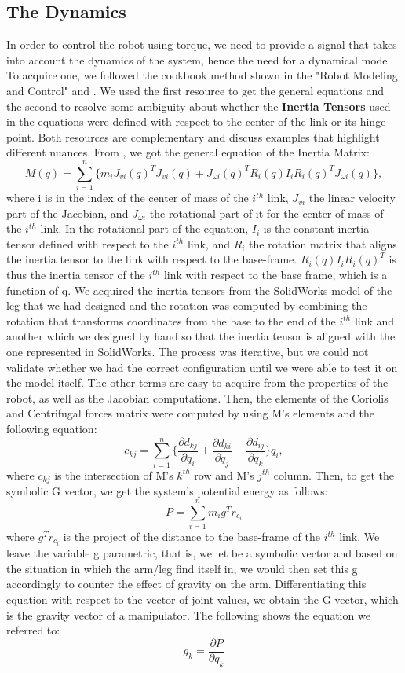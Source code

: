 \subsection{The Dynamics}
In order to control the robot using torque, we need to provide a signal that takes into account the dynamics of the system, hence the need for a dynamical model. To acquire one, we followed the cookbook method shown in the "Robot Modeling and Control" \cite{spong2006robot} and \cite{murray2017mathematical}. We used the first resource to get the general equations and the second to resolve some ambiguity about whether the \textbf{Inertia Tensors} used in the equations were defined with respect to the center of the link or its hinge point. Both resources are complementary and discuss examples that highlight different nuances.
From \cite{spong2006robot}, we got the general equation of the Inertia Matrix:
$$
M(q) = \sum_{i=1}^n \{m_i J_{vi}(q)^T J_{vi}(q) + J_{\omega i}(q)^T R_i(q) I_i R_i(q)^T J_{\omega i}(q)\},
$$
where i is in the index of the center of mass of the $i^{th}$ link, $J_{vi}$ the linear velocity part of the Jacobian, and  $J_{\omega i}$ the rotational part of it for the center of mass of the $i^{th}$ link. In the rotational part of the equation, $I_i$ is the constant inertia tensor defined with respect to the $i^{th}$ link, and $R_i$ the rotation matrix that aligns the inertia tensor to the link with respect to the base-frame. $R_i(q) I_i R_i(q)^T$ is thus the inertia tensor of the $i^{th}$ link with respect to the base frame, which is a function of q.
We acquired the inertia tensors from the SolidWorks model of the leg that we had designed and the rotation was computed by combining the rotation that transforms coordinates from the base to the end of the $i^{th}$ link and another which we designed by hand so that the inertia tensor is aligned with the one represented in SolidWorks. The process was iterative, but we could not validate whether we had the correct configuration until we were able to test it on the model itself.
The other terms are easy to acquire from the properties of the robot, as well as the Jacobian computations.
Then, the elements of the Coriolis and Centrifugal forces matrix were computed by using M's elements and the following equation:
$$
c_{kj} = \sum_{i=1}^n \{\frac{\partial d_{kj}}{\partial q_i} + \frac{\partial d_{ki}}{\partial q_j} - \frac{\partial d_{ij}}{\partial q_k} \}\dot{q_i},
$$
where $c_{kj}$ is the intersection of M's $k^{th}$ row and M's $j^{th}$ column.
Then, to get the symbolic G vector, we get the system's potential energy as follows:
$$
P = \sum_{i=1}^n m_i g^T r_{c_i}
$$
where $g^T r_{c_i}$ is the project of the distance to the base-frame of the $i^{th}$ link. We leave the variable g parametric, that is, we let be a symbolic vector and based on the situation in which the arm/leg find itself in, we would then set this g accordingly to counter the effect of gravity on the arm.
Differentiating this equation with respect to the vector of joint values, we obtain the G vector, which is the gravity vector of a manipulator. The following shows the equation we referred to:
$$
g_k = \frac{\partial P}{\partial q_k}
$$


